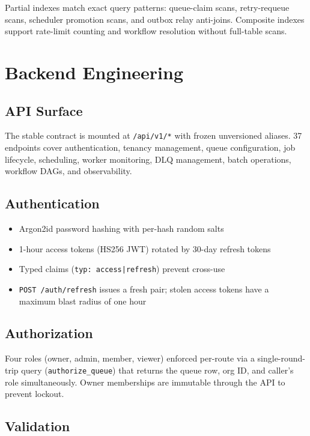\documentclass[11pt,a4paper]{article}
\begin{document}
Partial indexes match exact query patterns: queue-claim scans, retry-requeue
scans, scheduler promotion scans, and outbox relay anti-joins. Composite
indexes support rate-limit counting and workflow resolution without full-table
scans.

\section{Backend Engineering}

\subsection{API Surface}

The stable contract is mounted at \texttt{/api/v1/*} with frozen unversioned
aliases. 37 endpoints cover authentication, tenancy management, queue
configuration, job lifecycle, scheduling, worker monitoring, DLQ management,
batch operations, workflow DAGs, and observability.

\subsection{Authentication}

\begin{itemize}[nosep]
\item Argon2id password hashing with per-hash random salts
\item 1-hour access tokens (HS256 JWT) rotated by 30-day refresh tokens
\item Typed claims (\texttt{typ: access|refresh}) prevent cross-use
\item \texttt{POST /auth/refresh} issues a fresh pair; stolen access tokens
have a maximum blast radius of one hour
\end{itemize}

\subsection{Authorization}

Four roles (owner, admin, member, viewer) enforced per-route via a
single-round-trip query (\texttt{authorize\_queue}) that returns the queue
row, org ID, and caller's role simultaneously. Owner memberships are immutable
through the API to prevent lockout.

\subsection{Validation}
\end{document}
